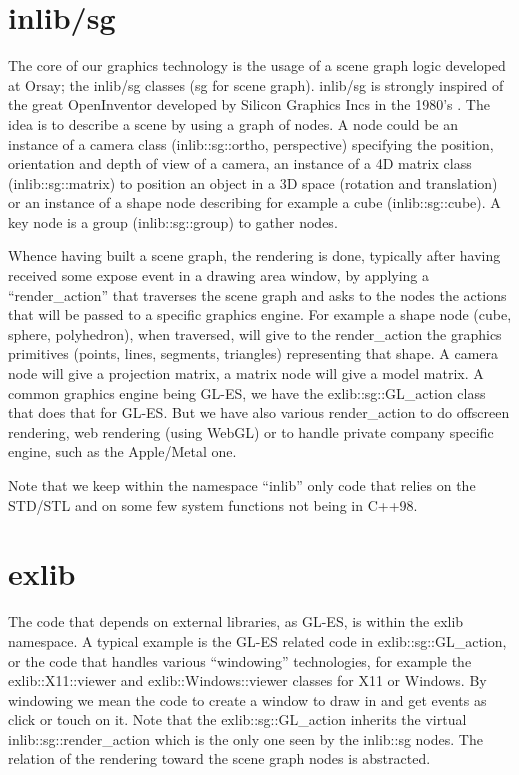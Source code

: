 \documentclass{webofc}
\begin{document}
\section{inlib/sg}
The core of our graphics technology is the usage of a scene graph
logic developed at Orsay; the inlib/sg classes (sg for scene graph).
inlib/sg is strongly inspired of the great OpenInventor developed by
Silicon Graphics Incs in the 1980's \cite{OpenInventor}. The idea is to describe a scene
by using a graph of nodes. A node could be an instance of a camera
class (inlib::sg::ortho, perspective) specifying the position, orientation and depth of view of a
camera, an instance of a 4D matrix class (inlib::sg::matrix) to position an object in a 3D
space (rotation and translation) or an instance of a shape node
describing for example a cube (inlib::sg::cube). A key node is a group
(inlib::sg::group) to gather nodes.

Whence having built a scene graph, the rendering is done, typically
after having received some expose event in a drawing area window, by
applying a ``render\_action'' that traverses the scene graph and asks to the
nodes the actions that will be passed to a specific graphics engine.
For example a shape node (cube, sphere, polyhedron), when traversed,
will give to the render\_action the graphics primitives (points, lines, segments, triangles)
representing that shape. A camera node will give a
projection matrix, a matrix node will give a model matrix. A common graphics engine
being GL-ES, we have the exlib::sg::GL\_action
class that does that for GL-ES. But we have also various render\_action
to do offscreen rendering, web rendering (using WebGL) or to handle private
company specific engine, such as the Apple/Metal one.

Note that we keep within the namespace ``inlib'' only code that relies
on the STD/STL and on some few system functions not being in C++98.

\section{exlib}
The code that depends on external libraries, as GL-ES, is within the
exlib namespace. A typical example is the GL-ES related code in
exlib::sg::GL\_action, or the code that handles various ``windowing''
technologies, for
example the exlib::X11::viewer and exlib::Windows::viewer classes for
X11 or Windows. By
windowing we mean the code to create a window to draw in and get events
as click or touch on it. Note that the
exlib::sg::GL\_action inherits the virtual inlib::sg::render\_action
which is the only one seen by the inlib::sg nodes. The relation of the rendering
toward the scene graph nodes is abstracted.
\end{document}
